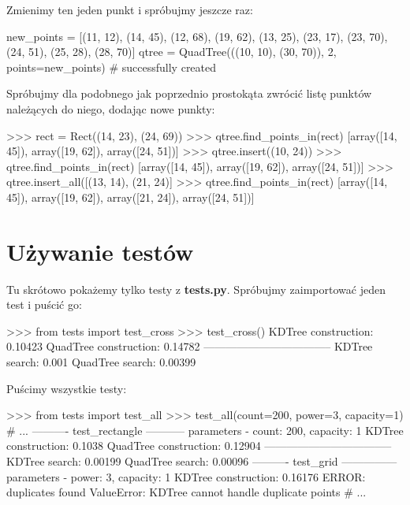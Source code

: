 \documentclass[a4paper, 12pt]{article}
\begin{document}
      \newpage
      \noindent
      \quad Zmienimy ten jeden punkt i spróbujmy jeszcze raz:
      \begin{python}
      new_points = [(11, 12), (14, 45), (12, 68), (19, 62), (13, 25),
                    (23, 17), (23, 70), (24, 51), (25, 28), (28, 70)]
      qtree = QuadTree(((10, 10), (30, 70)), 2, points=new_points)
      # successfully created
      \end{python}

      \noindent
      \quad Spróbujmy dla podobnego jak poprzednio prostokąta zwrócić listę punktów należących do niego, dodając nowe punkty:
      \begin{python}
      >>> rect = Rect((14, 23), (24, 69))
      >>> qtree.find_points_in(rect)
      [array([14, 45]), array([19, 62]), array([24, 51])]
      >>> qtree.insert((10, 24))
      >>> qtree.find_points_in(rect)
      [array([14, 45]), array([19, 62]), array([24, 51])]
      >>> qtree.insert_all([(13, 14), (21, 24)]
      >>> qtree.find_points_in(rect)
      [array([14, 45]), array([19, 62]), array([21, 24]), array([24, 51])]
      \end{python}

  \section{Używanie testów}
    \quad Tu skrótowo pokażemy tylko testy z \textbf{tests.py}. Spróbujmy zaimportować jeden test i puścić go:
    \begin{python}
    >>> from tests import test_cross
    >>> test_cross()
    KDTree construction:    0.10423
    QuadTree construction:	0.14782
    -----------------------------------
    KDTree search:		 	    0.001
    QuadTree search:		    0.00399
    \end{python}

    \noindent
    \quad Puścimy wszystkie testy:
    \begin{python}
    >>> from tests import test_all
    >>> test_all(count=200, power=3, capacity=1)
    # ...
    ---------- test_rectangle ----------- parameters - count: 200, capacity: 1
    KDTree construction:	  0.1038
    QuadTree construction:	0.12904
    -----------------------------------
    KDTree search:			    0.00199
    QuadTree search:		    0.00096
    ---------- test_grid --------------- parameters - power: 3, capacity: 1
    KDTree construction:	  0.16176
    ERROR: duplicates found
    ValueError: KDTree cannot handle duplicate points
    # ...
    \end{python}
\end{document}
